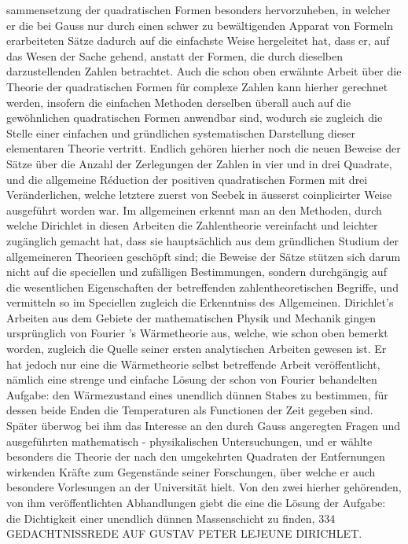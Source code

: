 \documentclass[11pt]{article}
\begin{document}
\noindent sammensetzung der quadratischen Formen besonders hervorzuheben, in welcher er die bei Gauss nur durch einen schwer zu bewältigenden Apparat von Formeln erarbeiteten Sätze dadurch auf die einfachste Weise hergeleitet hat, dass er, auf das Wesen der Sache gehend, anstatt der Formen, die durch dieselben darzustellenden Zahlen betrachtet. Auch die schon oben erwähnte Arbeit über die Theorie der quadratischen Formen für complexe Zahlen kann hierher gerechnet werden, insofern die einfachen Methoden derselben überall auch auf die gewöhnlichen quadratischen Formen anwendbar sind, wodurch sie zugleich die Stelle einer einfachen und gründlichen systematischen Darstellung dieser elementaren Theorie vertritt. Endlich gehören hierher noch die neuen Beweise der Sätze über die Anzahl der Zerlegungen der Zahlen in vier und in drei Quadrate, und die allgemeine Réduction der positiven quadratischen Formen mit drei Veränderlichen, welche letztere zuerst von Seebek in äusserst coinplicirter Weise ausgeführt worden war. Im allgemeinen erkennt man an den Methoden, durch welche Dirichlet in diesen Arbeiten die Zahlentheorie vereinfacht und leichter zugänglich gemacht hat, dass sie hauptsächlich aus dem gründlichen Studium der allgemeineren Theorieen geschöpft sind; die Beweise der Sätze stützen sich darum nicht auf die speciellen und zufälligen Bestimmungen, sondern durchgängig auf die wesentlichen Eigenschaften der betreffenden zahlentheoretischen Begriffe, und vermitteln so im Speciellen zugleich die Erkenntniss des Allgemeinen. Dirichlet’s Arbeiten aus dem Gebiete der mathematischen Physik und Mechanik gingen ursprünglich von Fourier ’s Wärmetheorie aus, welche, wie schon oben bemerkt worden, zugleich die Quelle seiner ersten analytischen Arbeiten gewesen ist. Er hat jedoch nur eine die Wärmetheorie selbst betreffende Arbeit veröffentlicht, nämlich eine strenge und einfache Lösung der schon von Fourier behandelten Aufgabe: den Wärmezustand eines unendlich dünnen Stabes zu bestimmen, für dessen beide Enden die Temperaturen als Functionen der Zeit gegeben sind. Später überwog bei ihm das Interesse an den durch Gauss angeregten Fragen und ausgeführten mathematisch - physikalischen Untersuchungen, und er wählte besonders die Theorie der nach den umgekehrten Quadraten der Entfernungen wirkenden Kräfte zum Gegenstände seiner Forschungen, über welche er auch besondere Vorlesungen an der Universität hielt. Von den zwei hierher gehörenden, von ihm veröffentlichten Abhandlungen giebt die eine die Lösung der Aufgabe: die Dichtigkeit einer unendlich dünnen Massenschicht zu finden, 334 GEDACHTNISSREDE AUF GUSTAV PETER LEJEUNE DIRICHLET.
\par
\end{document}
